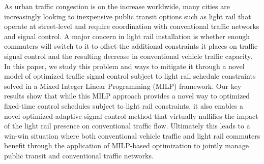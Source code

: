 As urban traffic congestion is on the increase worldwide, many cities
are increasingly looking to inexpensive public transit options such as
light rail that operate at street-level and require coordination with
conventional traffic networks and signal control. A major concern in
light rail installation is whether enough commuters will switch to it
to offset the additional constraints it places on traffic signal
control and the resulting decrease in conventional vehicle traffic
capacity. In this paper, we study this problem and ways to mitigate it
through a novel model of optimized traffic signal control subject to
light rail schedule constraints solved in a Mixed Integer Linear
Programming (MILP) framework. Our key results show that while this
MILP approach provides a novel way to optimized fixed-time control
schedules subject to light rail constraints, it also enables a
novel optimized adaptive signal control method that virtually
nullifies the impact of the light rail presence on conventional
traffic flow.  Ultimately this leads to a win-win situation where both
conventional vehicle traffic and light rail commuters benefit through
the application of MILP-based optimization to jointly manage public
transit and conventional traffic networks.
